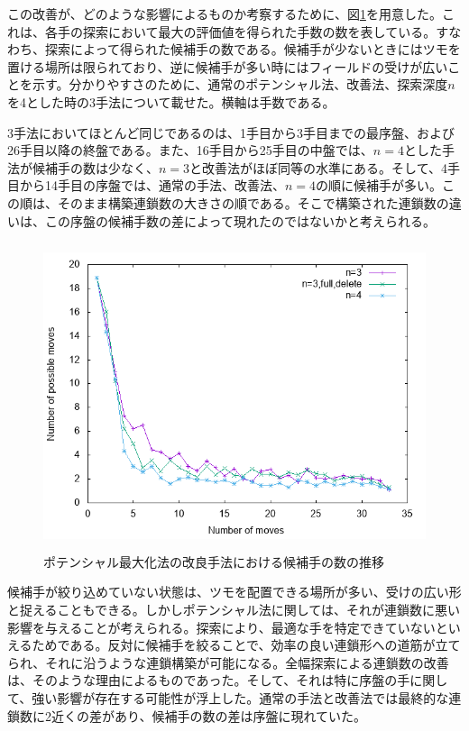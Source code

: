 \documentclass[12pt]{jreport}
\begin{document}
この改善が、どのような影響によるものか考察するために、図\ref{fig:poten_tsumoList}を用意した。これは、各手の探索において最大の評価値を得られた手数の数を表している。すなわち、探索によって得られた候補手の数である。候補手が少ないときにはツモを置ける場所は限られており、逆に候補手が多い時にはフィールドの受けが広いことを示す。分かりやすさのために、通常のポテンシャル法、改善法、探索深度$n$を4とした時の3手法について載せた。横軸は手数である。

3手法においてほとんど同じであるのは、1手目から3手目までの最序盤、および26手目以降の終盤である。また、16手目から25手目の中盤では、$n=4$とした手法が候補手の数は少なく、$n=3$と改善法がほぼ同等の水準にある。そして、4手目から14手目の序盤では、通常の手法、改善法、$n=4$の順に候補手が多い。この順は、そのまま構築連鎖数の大きさの順である。そこで構築された連鎖数の違いは、この序盤の候補手数の差によって現れたのではないかと考えられる。

\begin{figure}[tb]
  \begin{center}
  \includegraphics[height=9cm]{experiment/Potential/KAI/graph/tsumoList_D3_fulldel_D4.png}
  \caption{ポテンシャル最大化法の改良手法における候補手の数の推移} \label{fig:poten_tsumoList}
\end{center}
\end{figure}

候補手が絞り込めていない状態は、ツモを配置できる場所が多い、受けの広い形と捉えることもできる。しかしポテンシャル法に関しては、それが連鎖数に悪い影響を与えることが考えられる。探索により、最適な手を特定できていないといえるためである。反対に候補手を絞ることで、効率の良い連鎖形への道筋が立てられ、それに沿うような連鎖構築が可能になる。全幅探索による連鎖数の改善は、そのような理由によるものであった。そして、それは特に序盤の手に関して、強い影響が存在する可能性が浮上した。通常の手法と改善法では最終的な連鎖数に2近くの差があり、候補手の数の差は序盤に現れていた。
\end{document}
